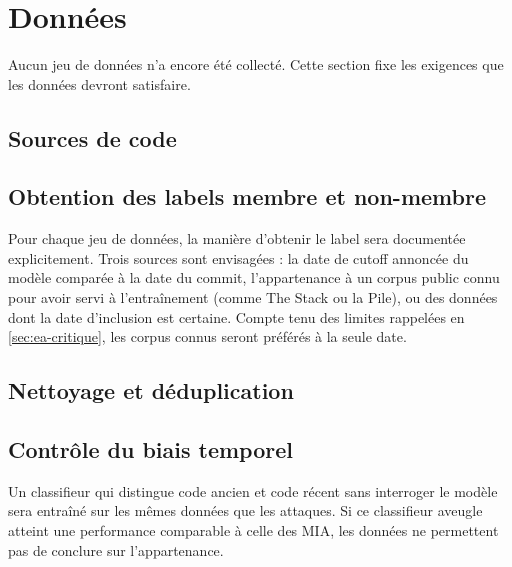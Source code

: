 \section{Données}\label{sec:donnees}
	Aucun jeu de données n'a encore été collecté. Cette section fixe les exigences que les données devront satisfaire.

	\subsection{Sources de code}\label{sec:donnees-sources}
	\subsection{Obtention des labels membre et non-membre}\label{sec:donnees-labels}
		Pour chaque jeu de données, la manière d'obtenir le label sera documentée explicitement. Trois sources sont envisagées : la date de cutoff annoncée du modèle comparée à la date du commit, l'appartenance à un corpus public connu pour avoir servi à l'entraînement (comme The Stack ou la Pile), ou des données dont la date d'inclusion est certaine. Compte tenu des limites rappelées en \cref{sec:ea-critique}, les corpus connus seront préférés à la seule date.

	\subsection{Nettoyage et déduplication}\label{sec:donnees-dedup}
	\subsection{Contrôle du biais temporel}\label{sec:donnees-biais}
		Un classifieur qui distingue code ancien et code récent sans interroger le modèle sera entraîné sur les mêmes données que les attaques. Si ce classifieur aveugle atteint une performance comparable à celle des MIA, les données ne permettent pas de conclure sur l'appartenance.

